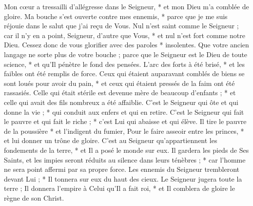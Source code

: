  Mon cœur a tressailli d'allégresse dans le Seigneur, * et mon Dieu m'a comblée de gloire.
\versseparator
 Ma bouche s'est ouverte contre mes ennemis, * parce que je me suis réjouie dans le salut que j'ai reçu de Vous.
\versseparator
 Nul n'est saint comme le Seigneur ; car il n'y en a point, Seigneur, d'autre que Vous, * et nul n'est fort comme notre Dieu.
\versseparator
 Cessez donc de vous glorifier avec des paroles * insolentes.
\versseparator
 Que votre ancien langage ne sorte plus de votre bouche ; parce que le Seigneur est le Dieu de toute science, * et qu'Il pénètre le fond des pensées.
\versseparator
 L'arc des forts à été brisé, * et les faibles ont été remplis de force.
\versseparator
 Ceux qui étaient auparavant comblés de biens se sont loués pour avoir du pain, * et ceux qui étaient pressés de la faim ont été rassasiés.
\versseparator
 Celle qui était stérile est devenue mère de beaucoup d'enfants ; * et celle qui avait des fils nombreux a été affaiblie.
\versseparator
 C'est le Seigneur qui ôte et qui donne la vie ; * qui conduit aux enfers et qui en retire.
\versseparator
 C'est le Seigneur qui fait le pauvre et qui fait le riche ; * c'est Lui qui abaisse et qui élève.
\versseparator
 Il tire le pauvre de la poussière * et l'indigent du fumier,
\versseparator
 Pour le faire asseoir entre les princes, * et lui donner un trône de gloire.
\versseparator
 C'est au Seigneur qu'appartiennent les fondements de la terre, * et Il a posé le monde sur eux.
\versseparator
 Il gardera les pieds de Ses Saints, et les impies seront réduits au silence dans leurs ténèbres ; * car l'homme ne sera point affermi par sa propre force.
\versseparator
 Les ennemis du Seigneur trembleront devant Lui ; * Il tonnera sur eux du haut des cieux.
\versseparator
 Le Seigneur jugera toute la terre ; Il donnera l'empire à Celui qu'Il a fait roi, * et Il comblera de gloire le règne de son Christ.